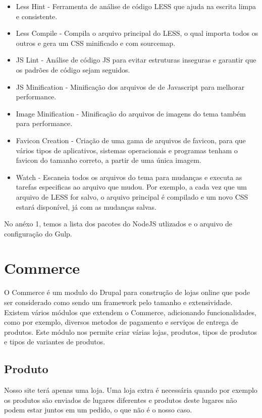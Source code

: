 \begin{itemize}
  \item Less Hint - Ferramenta de análise de código LESS que ajuda na escrita limpa e consistente.
  \item Less Compile - Compila o arquivo principal do LESS, o qual importa todos os outros e gera um CSS minificado e com sourcemap\TODO.
  \item JS Lint - Análise de código JS para evitar estruturas inseguras e garantir que os padrões de código sejam seguidos.
  \item JS Minification - Minificação dos arquivos de de Javascript para melhorar performance.
  \item Image Minification - Minificação do arquivos de imagens do tema também para performance.
  \item Favicon Creation - Criação de uma gama de arquivos de favicon, para que vários tipos de aplicativos, sistemas operacionais e programas tenham o favicon do tamanho correto, a partir de uma  única imagem.
  \item Watch - Escaneia todos os arquivos do tema para mudanças e executa as tarefas especificas ao arquivo que mudou. Por exemplo, a cada vez que um arquivo de LESS for salvo, o arquivo principal é compilado e um novo CSS estará disponível, já com as mudanças salvas.
\end{itemize}

No anéxo 1, temos a lista dos pacotes do NodeJS utlizados e o arquivo de configuração do Gulp.

\section{Commerce}
O Commerce é um modulo do Drupal para construção de lojas online que pode ser considerado como sendo um framework pelo tamanho e extensividade. Existem vários módulos que extendem o Commerce, adicionando funcionalidades, como por exemplo, diversos metodos de pagamento e serviços de entrega de produtos. Este módulo nos permite criar várias lojas, produtos, tipos de produtos e tipos de variantes de produtos.

\subsection{Produto}
Nosso site terá apenas uma loja. Uma loja extra é necessária quando por exemplo os produtos são enviados de lugares diferentes e produtos deste lugares não podem estar juntos em um pedido, o que não é o nosso caso.

